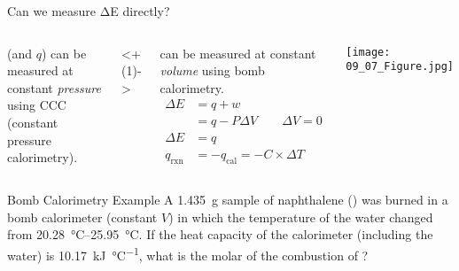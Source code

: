 \documentclass[handout]{beamer}
\begin{document}
\begin{frame}{Can we measure ΔE directly?}
	\begin{columns}
		\enthalpy*[superscript=]{} (and $q$) can be
		measured at constant \emph{pressure} using
		CCC (constant pressure
		calorimetry).

		\onslide<+(1)->
		\vspace{\baselineskip}

		\energy*[superscript=]{} can be measured at
		constant \emph{volume} using \alert{bomb
		calorimetry}.
		\begin{align*}
			\Delta E &= q + w \\
			&= q - P\Delta V \qquad \Delta V = 0 \\
			\Delta E &= q \\
			q_\text{rxn} &= -q_\text{cal} = -C
			\times \Delta T
		\end{align*}
		
		\begin{center}
			\texttt{[image: 09\_07\_Figure.jpg]}
		\end{center}
	\end{columns}
\end{frame}


\begin{frame}[t]{Bomb Calorimetry Example}
	A \SI{1.435}{\gram} sample of naphthalene () was burned in a
	bomb calorimeter (constant $V$) in which the temperature of the water
	changed from \SIrange{20.28}{25.95}{\celsius}. If the heat capacity of
	the calorimeter (including the water) is
	\SI{10.17}{\kilo\joule\per\celsius}, what is the molar
	\energy*[superscript=]{} of the
	combustion of ?

\end{frame}
\end{document}
